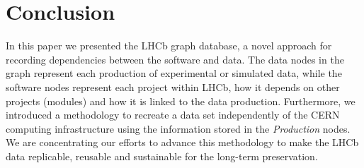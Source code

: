 \section {Conclusion}


In this paper we presented the LHCb graph database, a novel approach for recording dependencies between the software and data. The data nodes in the graph represent each production of experimental or simulated data, while the software nodes represent each project within LHCb, how it depends on other projects (modules) and how it is linked to the data production. Furthermore, we introduced a methodology to recreate a data set independently of the CERN computing infrastructure using the information stored in the \emph{Production} nodes. We are concentrating our efforts to advance this methodology to make the LHCb data replicable, reusable and sustainable for the long-term preservation.  